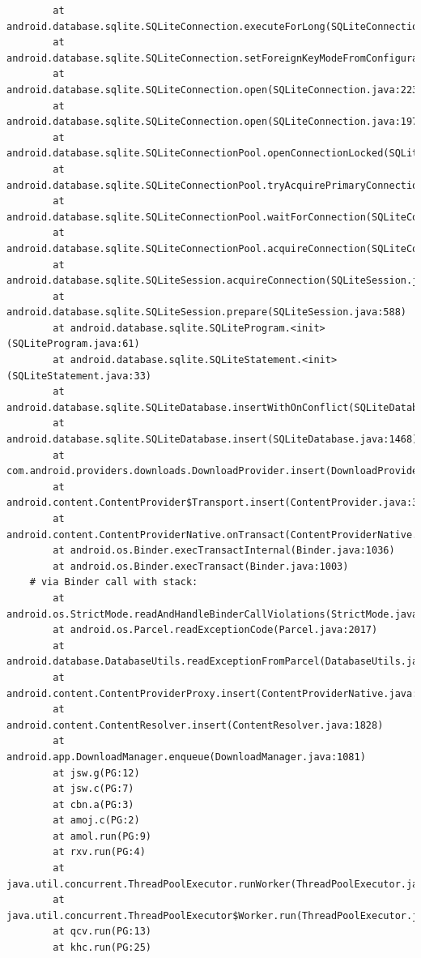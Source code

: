\documentclass[a4paper,12pt]{book}
\begin{document}
\begin{lstlisting}
        at android.database.sqlite.SQLiteConnection.executeForLong(SQLiteConnection.java:688)
        at android.database.sqlite.SQLiteConnection.setForeignKeyModeFromConfiguration(SQLiteConnection.java:290)
        at android.database.sqlite.SQLiteConnection.open(SQLiteConnection.java:223)
        at android.database.sqlite.SQLiteConnection.open(SQLiteConnection.java:197)
        at android.database.sqlite.SQLiteConnectionPool.openConnectionLocked(SQLiteConnectionPool.java:505)
        at android.database.sqlite.SQLiteConnectionPool.tryAcquirePrimaryConnectionLocked(SQLiteConnectionPool.java:949)
        at android.database.sqlite.SQLiteConnectionPool.waitForConnection(SQLiteConnectionPool.java:699)
        at android.database.sqlite.SQLiteConnectionPool.acquireConnection(SQLiteConnectionPool.java:380)
        at android.database.sqlite.SQLiteSession.acquireConnection(SQLiteSession.java:896)
        at android.database.sqlite.SQLiteSession.prepare(SQLiteSession.java:588)
        at android.database.sqlite.SQLiteProgram.<init>(SQLiteProgram.java:61)
        at android.database.sqlite.SQLiteStatement.<init>(SQLiteStatement.java:33)
        at android.database.sqlite.SQLiteDatabase.insertWithOnConflict(SQLiteDatabase.java:1597)
        at android.database.sqlite.SQLiteDatabase.insert(SQLiteDatabase.java:1468)
        at com.android.providers.downloads.DownloadProvider.insert(DownloadProvider.java:972)
        at android.content.ContentProvider$Transport.insert(ContentProvider.java:309)
        at android.content.ContentProviderNative.onTransact(ContentProviderNative.java:154)
        at android.os.Binder.execTransactInternal(Binder.java:1036)
        at android.os.Binder.execTransact(Binder.java:1003)
    # via Binder call with stack:
        at android.os.StrictMode.readAndHandleBinderCallViolations(StrictMode.java:2289)
        at android.os.Parcel.readExceptionCode(Parcel.java:2017)
        at android.database.DatabaseUtils.readExceptionFromParcel(DatabaseUtils.java:137)
        at android.content.ContentProviderProxy.insert(ContentProviderNative.java:481)
        at android.content.ContentResolver.insert(ContentResolver.java:1828)
        at android.app.DownloadManager.enqueue(DownloadManager.java:1081)
        at jsw.g(PG:12)
        at jsw.c(PG:7)
        at cbn.a(PG:3)
        at amoj.c(PG:2)
        at amol.run(PG:9)
        at rxv.run(PG:4)
        at java.util.concurrent.ThreadPoolExecutor.runWorker(ThreadPoolExecutor.java:1167)
        at java.util.concurrent.ThreadPoolExecutor$Worker.run(ThreadPoolExecutor.java:641)
        at qcv.run(PG:13)
        at khc.run(PG:25)

\end{lstlisting}
\end{document}
